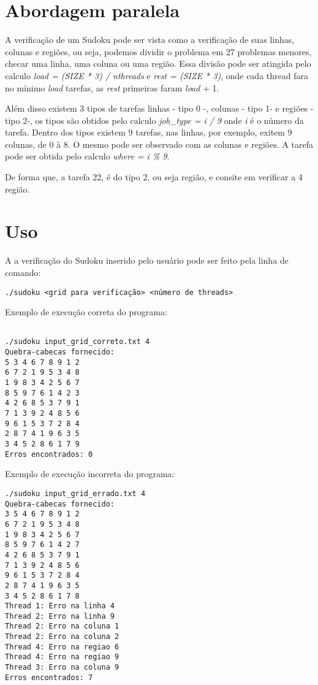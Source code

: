 \documentclass[a4paper, 12pt]{article}
\begin{document}
\section{Abordagem paralela}
A verificação de um Sudoku pode ser vista como a verificação de suas linhas,
colunas e regiões, ou seja, podemos dividir o problema em 27 problemas menores,
checar uma linha, uma coluna ou uma região.
Essa divisão pode ser atingida pelo calculo \textit{load = (SIZE * 3) / nthreads} e
\textit{rest = (SIZE * 3)}, onde cada thread fara no mínimo \textit{load} tarefas,
as \textit{rest} primeiras faram \textit{load} + 1.
\par
Além disso existem 3 tipos de tarefas linhas - tipo 0 -, colunas - tipo 1-  e
regiões - tipo 2-, os tipos são obtidos pelo calculo \textit{job\_type = i / 9}
onde \textit{i} é o número da tarefa. Dentro dos tipos existem 9 tarefas, nas
linhas, por exemplo, exitem 9 colunas, de 0 à 8. O mesmo pode ser observado com
as colunas e regiões. A tarefa pode ser obtida pelo calculo \textit{where = i \% 9}.
\par
De forma que, a tarefa 22, é do tipo 2, ou seja região, e consite em verificar
a 4 região.


\section{Uso}

A a verificação do Sudoku inserido pelo usuário pode ser feito pela linha de comando:
\begin{verbatim}
./sudoku <grid para verificação> <número de threads>
\end{verbatim}

Exemplo de execução correta do programa:

\begin{verbatim}

./sudoku input_grid_correto.txt 4
Quebra-cabecas fornecido:
5 3 4 6 7 8 9 1 2
6 7 2 1 9 5 3 4 8
1 9 8 3 4 2 5 6 7
8 5 9 7 6 1 4 2 3
4 2 6 8 5 3 7 9 1
7 1 3 9 2 4 8 5 6
9 6 1 5 3 7 2 8 4
2 8 7 4 1 9 6 3 5
3 4 5 2 8 6 1 7 9
Erros encontrados: 0
\end{verbatim}

Exemplo de execução incorreta do programa:

\begin{verbatim}
./sudoku input_grid_errado.txt 4
Quebra-cabecas fornecido:
3 5 4 6 7 8 9 1 2
6 7 2 1 9 5 3 4 8
1 9 8 3 4 2 5 6 7
8 5 9 7 6 1 4 2 7
4 2 6 8 5 3 7 9 1
7 1 3 9 2 4 8 5 6
9 6 1 5 3 7 2 8 4
2 8 7 4 1 9 6 3 5
3 4 5 2 8 6 1 7 8
Thread 1: Erro na linha 4
Thread 2: Erro na linha 9
Thread 2: Erro na coluna 1
Thread 2: Erro na coluna 2
Thread 4: Erro na regiao 6
Thread 4: Erro na regiao 9
Thread 3: Erro na coluna 9
Erros encontrados: 7
\end{verbatim}
\end{document}

